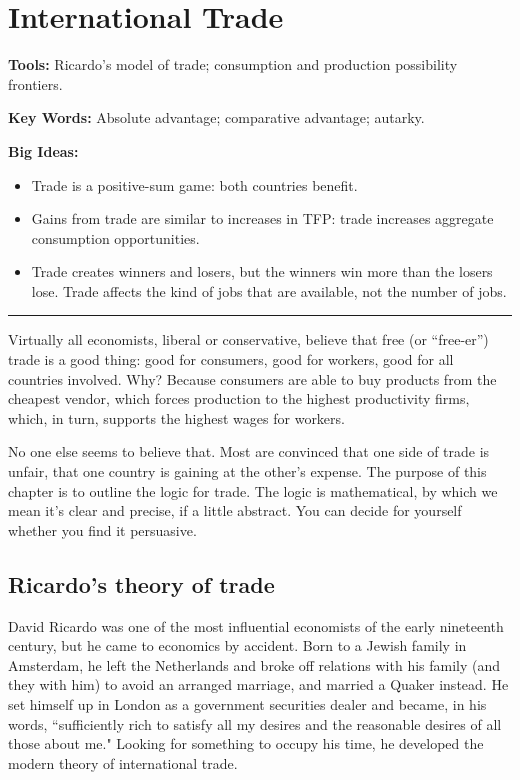 \chapter{International Trade}\label{chp:intr}
\hypertarget{trade}{}

\textbf{Tools:} Ricardo's model of trade; consumption and production possibility frontiers.

\textbf{Key Words:} Absolute advantage; comparative advantage; autarky.

\textbf{Big Ideas:}
\vspace{-0.1in}
\begin{itemize}
\item Trade is a positive-sum game:  both countries benefit.
\item Gains from trade are similar to increases in TFP:  trade increases aggregate consumption opportunities.
\item Trade creates winners and losers, but the winners win more than the losers lose.
 Trade affects the kind of jobs that are available, not the number of jobs.
\end{itemize}
\rule{\textwidth}{1pt}

Virtually all economists, liberal or conservative, believe that
free (or ``free-er'') trade is a good thing:
good for consumers, good for workers,
good for all countries involved.
Why?  Because consumers are able to buy products
from the cheapest vendor,
which forces production to the highest productivity firms,
which, in turn, supports the highest wages for workers.

No one else seems to believe that.
Most are convinced that one side of trade is unfair, that one country
is gaining at the other's expense.
The purpose of this chapter is to outline the logic for trade.
The logic is mathematical, by which we mean it's clear and precise,
if a little abstract.
You can decide for yourself whether you find it persuasive.


\section{Ricardo's theory of trade}

David Ricardo was one of the most influential economists of the early
nineteenth century,
but he came to economics by accident.  Born to a
Jewish family in Amsterdam, he left the Netherlands and broke off
relations with his family (and they with him) to avoid an arranged
marriage, and married a Quaker instead.  He set himself up in
London as a government securities dealer and became, in his words,
``sufficiently rich to satisfy all my desires and the reasonable
desires of all those about me."  Looking for something to occupy
his time, he developed the modern theory of international trade.


